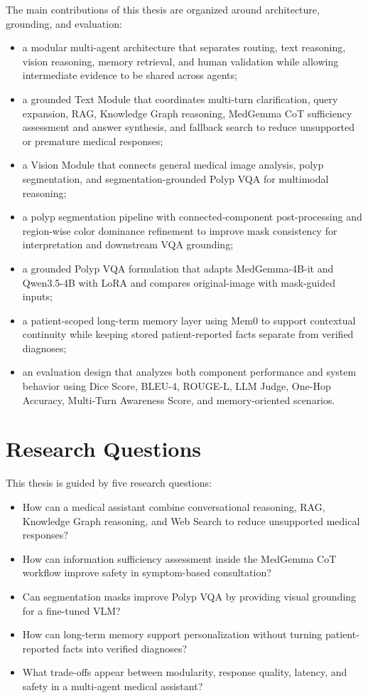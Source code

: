 The main contributions of this thesis are organized around architecture, grounding, and evaluation:

\begin{itemize}
    \item a modular multi-agent architecture that separates routing, text reasoning, vision reasoning, memory retrieval, and human validation while allowing intermediate evidence to be shared across agents;
    \item a grounded Text Module that coordinates multi-turn clarification, query expansion, RAG, Knowledge Graph reasoning, MedGemma CoT sufficiency assessment and answer synthesis, and fallback search to reduce unsupported or premature medical responses;
    \item a Vision Module that connects general medical image analysis, polyp segmentation, and segmentation-grounded Polyp VQA for multimodal reasoning;
    \item a polyp segmentation pipeline with connected-component post-processing and region-wise color dominance refinement to improve mask consistency for interpretation and downstream VQA grounding;
    \item a grounded Polyp VQA formulation that adapts MedGemma-4B-it and Qwen3.5-4B with LoRA and compares original-image with mask-guided inputs;
    \item a patient-scoped long-term memory layer using Mem0 to support contextual continuity while keeping stored patient-reported facts separate from verified diagnoses;
    \item an evaluation design that analyzes both component performance and system behavior using Dice Score, BLEU-4, ROUGE-L, LLM Judge, One-Hop Accuracy, Multi-Turn Awareness Score, and memory-oriented scenarios.
\end{itemize}

\section{Research Questions}

This thesis is guided by five research questions:

\begin{itemize}
    \item How can a medical assistant combine conversational reasoning, RAG, Knowledge Graph reasoning, and Web Search to reduce unsupported medical responses?
    \item How can information sufficiency assessment inside the MedGemma CoT workflow improve safety in symptom-based consultation?
    \item Can segmentation masks improve Polyp VQA by providing visual grounding for a fine-tuned VLM?
    \item How can long-term memory support personalization without turning patient-reported facts into verified diagnoses?
    \item What trade-offs appear between modularity, response quality, latency, and safety in a multi-agent medical assistant?
\end{itemize}

